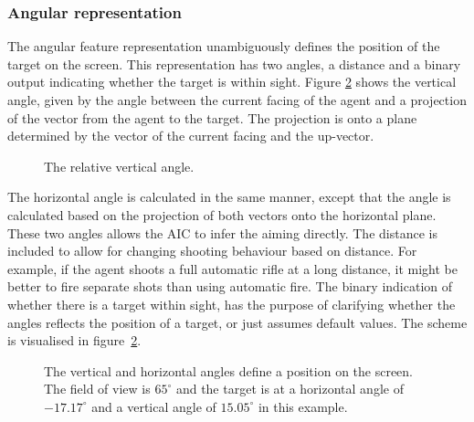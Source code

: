 \subsubsection{Angular representation}
\label{sec:angular}
The angular feature representation unambiguously defines the position of the target on the screen. This representation has two angles, a distance and a binary output indicating whether the target is within sight. Figure \ref{fig:angular} shows the vertical angle, given by the angle between the current facing of the agent and a projection of the vector from the agent to the target. The projection is onto a plane determined by the vector of the current facing and the up-vector.
\begin{figure}[H]
    \centering
    	\begin{scriptsize}
		\sffamily
    	
    	\end{scriptsize}
    \caption[Calculation of angles]{The relative vertical angle.}
    \label{fig:angular}
\end{figure}
\noindent
The horizontal angle is calculated in the same manner, except that the angle is calculated based on the projection of both vectors onto the horizontal plane. These two angles allows the AIC to infer the aiming directly. The distance is included to allow for changing shooting behaviour based on distance. For example, if the agent shoots a full automatic rifle at a long distance, it might be better to fire separate shots than using automatic fire. The binary indication of whether there is a target within sight, has the purpose of clarifying whether the angles reflects the position of a target, or just assumes default values. The scheme is visualised in figure~\ref{fig:angular}.
\begin{figure}[H]
    \centering
    	\begin{scriptsize}
		\sffamily
    	
    	\end{scriptsize}
    \caption[Angular representation of the visual state]{The vertical and horizontal angles define a position on the screen. The field of view is $65^\circ$ and the target is at a horizontal angle of $-17.17^\circ$ and a vertical angle of $15.05^\circ$ in this example.}
    \label{fig:angular}
\end{figure}

